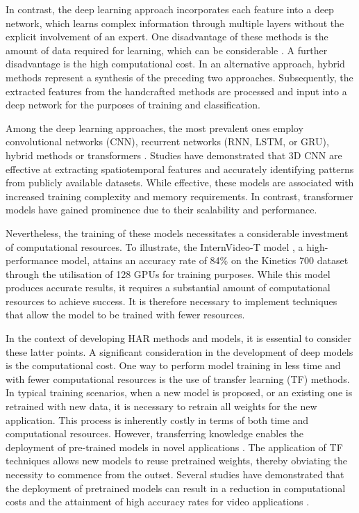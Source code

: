 \documentclass[mathematics,article,submit,pdftex,moreauthors]{Definitions/mdpi}
\begin{document}
In contrast, the deep learning approach incorporates each feature into a deep network, which learns complex information through multiple layers without the explicit involvement of an expert. One disadvantage of these methods is the amount of data required for learning, which can be considerable \cite{s23042182}. A further disadvantage is the high computational cost. In an alternative approach, hybrid methods represent a synthesis of the preceding two approaches. Subsequently, the extracted features from the handcrafted methods are processed and input into a deep network for the purposes of training and classification.

Among the deep learning approaches, the most prevalent ones employ convolutional networks (CNN), recurrent networks (RNN, LSTM, or GRU), hybrid methods or transformers \cite{s23042182}. Studies have demonstrated that 3D CNN are effective at extracting spatiotemporal features and accurately identifying patterns from publicly available datasets. While effective, these models are associated with increased training complexity and memory requirements. In contrast, transformer models have gained prominence due to their scalability and performance.

Nevertheless, the training of these models necessitates a considerable investment of computational resources\cite{Pareek2021-zg}. To illustrate, the InternVideo-T model \cite{wang2022internvideo}, a high-performance model, attains an accuracy rate of 84\% on the Kinetics 700 dataset \cite{smaira2020short} through the utilisation of 128 GPUs for training purposes. While this model produces accurate results, it requires a substantial amount of computational resources to achieve success. It is therefore necessary to implement techniques that allow the model to be trained with fewer resources. 

In the context of developing HAR methods and models, it is essential to consider these latter points. A significant consideration in the development of deep models is the computational cost. One way to perform model training in less time and with fewer computational resources is the use of transfer learning (TF) methods. In typical training scenarios, when a new model is proposed, or an existing one is retrained with new data, it is necessary to retrain all weights for the new application. This process is inherently costly in terms of both time and computational resources. However, transferring knowledge enables the deployment of pre-trained models in novel applications \cite{Tammina_2019}. The application of TF techniques allows new models to reuse pretrained weights, thereby obviating the necessity to commence from the outset. Several studies have demonstrated that the deployment of pretrained models can result in a reduction in computational costs and the attainment of high accuracy rates for video applications \cite{8659002}.
\end{document}
